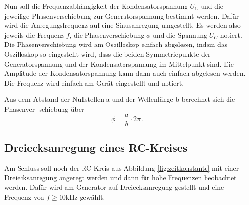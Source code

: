Nun soll die Frequenzabhängigkeit der Kondensatorspannung $U_C$ und die jeweilige
Phasenverschiebung zur Generatorspannung bestimmt werden.
Dafür wird die Anregungsfrequenz auf eine Sinusanregung umgestellt.
Es werden also jeweils die Frequenz $f$, die Phasenverschiebung $\phi$ und die Spannung $U_C$ notiert.
Die Phasenverschiebung wird am Oszilloskop einfach abgelesen, indem das Oszilloskop so eingestellt wird,
dass die beiden Symmetriepunkte der Generatorspannung und der Kondensatorspannung im Mittelpunkt sind.
Die Amplitude der Kondensatorspannung kann dann auch einfach abgelesen werden.
Die Frequenz wird einfach am Gerät eingestellt und notiert.

Aus dem Abstand der Nullstellen a und der Wellenlänge b berechnet sich die Phasenver-
schiebung über
\begin{equation} \label{eq:phase}
    \phi=\frac{a}{b} \cdot 2 \pi \, .
\end{equation}

\subsection{Dreiecksanregung eines RC-Kreises}

Am Schluss soll noch der RC-Kreis aus Abbildung \ref{fig:zeitkonstante} mit einer Dreiecksanregung angeregt werden
und dann für hohe Frequenzen beobachtet werden.
Dafür wird am Generator auf Dreiecksanregung gestellt und eine Frequenz von $f \geq 10 \si{\kilo\hertz}$ gewählt.